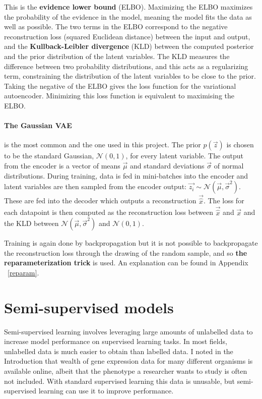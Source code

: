 This is the \textbf{evidence lower bound} (ELBO). Maximizing the ELBO maximizes the probability of the 
evidence in the model, meaning the model fits the data as well as possible. The two terms in the ELBO correspond to the negative 
reconstruction loss (squared Euclidean distance) between the input and output, and the \textbf{Kullback-Leibler divergence} (KLD) between 
the computed posterior and the prior distribution of the latent variables. 
The KLD measures the difference between two probability distributions, and this acts as a regularizing term, constraining the distribution 
of the latent variables to be close to the prior. Taking the 
negative of the ELBO gives the loss function for the variational autoencoder. Minimizing this loss function is equivalent to maximising the ELBO.

\paragraph{The Gaussian VAE}is the most common and the one used in this project. The prior $p(\vec{z})$ is chosen to be the standard Gaussian, 
$\mathcal{N}(0, 1)$,
for every latent variable. The output from the encoder is a vector of means $\vec{\mu}$ and standard deviations $\vec{\sigma}$ of normal distributions. 
During training, data is fed in mini-batches into the encoder and latent variables are then sampled from the encoder output: 
$\vec{z_{i}} \sim \mathcal{N}(\vec{\mu}, \vec{\sigma}^{2})$. These are fed into the decoder which outputs a reconstruction $\vec{\hat{x}}$. 
The loss for each datapoint is then computed as the reconstruction loss between $\vec{\hat{x}}$ and $\vec{x}$ and the KLD between
$\mathcal{N}(\vec{\mu}, \vec{\sigma}^{2})$ and $\mathcal{N}(0, 1)$.

Training is again done by backpropagation but
it is not possible to backpropagate the reconstruction loss through the drawing of the random sample, and so 
\textbf{the reparameterization trick} is used. 
An explanation can be found in Appendix ~\ref{reparam}.

\section{Semi-supervised models} \label{ss_models}

Semi-supervised learning involves leveraging large amounts of unlabelled data to increase model performance on supervised learning tasks. 
In most fields, unlabelled data is much easier to obtain than labelled data. I noted in the Introduction that wealth of gene 
expression data for many different organisms is available online, albeit that the phenotype a researcher wants 
to study is often not included. With standard supervised learning this data is unusable, but semi-supervised learning
can use it to improve performance. 


